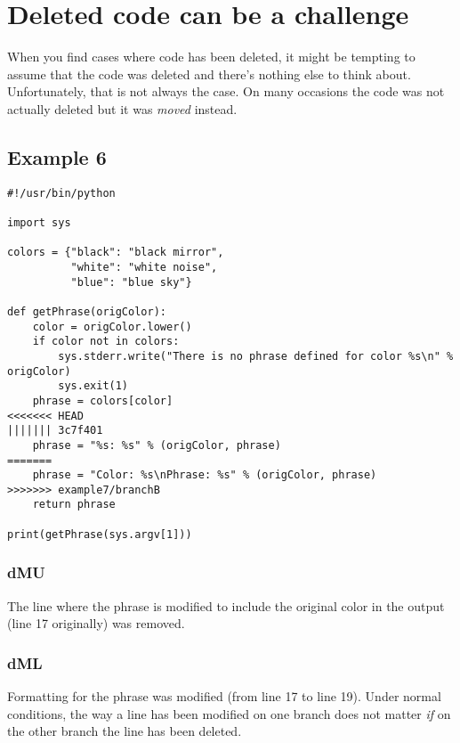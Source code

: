 
\section{Deleted code can be a challenge}
\label{deleted_code}

When you find cases where code has been deleted, it might be tempting to assume that the code was deleted and there's nothing
else to think about. Unfortunately, that is not always the case. On many occasions the code was not actually deleted but
it was {\it moved} instead.

\subsection{Example 6}
\label{example_06}

\begin{lstlisting}[style=python_style,
	basicstyle=\small,
	caption={\bf example 6}]
#!/usr/bin/python

import sys

colors = {"black": "black mirror",
          "white": "white noise",
          "blue": "blue sky"}

def getPhrase(origColor):
    color = origColor.lower()
    if color not in colors:
        sys.stderr.write("There is no phrase defined for color %s\n" % origColor)
        sys.exit(1)
    phrase = colors[color]
<<<<<<< HEAD
||||||| 3c7f401
    phrase = "%s: %s" % (origColor, phrase)
=======
    phrase = "Color: %s\nPhrase: %s" % (origColor, phrase)
>>>>>>> example7/branchB
    return phrase

print(getPhrase(sys.argv[1]))
\end{lstlisting}

\subsubsection{dMU}
The line where the phrase is modified to include the original color in the output (line 17 originally) was removed.

\subsubsection{dML}
Formatting for the phrase was modified (from line 17 to line 19). Under normal conditions, the way a line has been modified on one
branch does not matter {\it if} on the other branch the line has been deleted.

